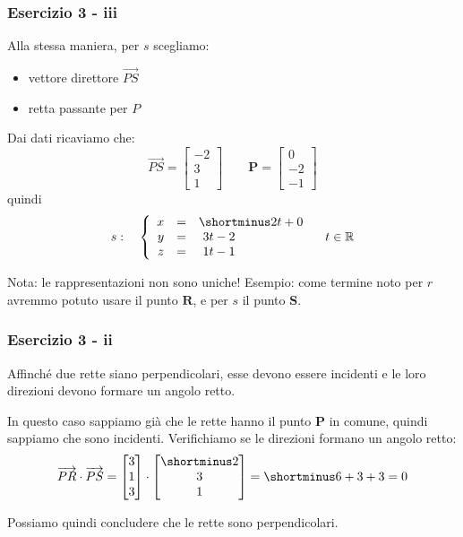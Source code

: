 \documentclass{beamer}
\begin{document}
\begin{frame}
\frametitle{Esercizio 3 - iii}

Alla stessa maniera, per $s$ scegliamo:
\begin{itemize}
        \item vettore direttore $\overrightarrow{PS}$
        \item retta passante per $P$
\end{itemize}
Dai dati ricaviamo che:
$$
\overrightarrow{PS} = \left[
\begin{array}{c}
-2\\
3\\
1
\end{array}
\right]
\qquad
\mathbf P = \left[
\begin{array}{c}
0\\
-2\\
-1
\end{array}
\right]
$$
quindi 
$$s: \quad \left\{
\begin{array}{rcl}
x&=&\shortminus 2t+0\\
y&=&\ 3t-2\\
z&=&\ 1t-1
\end{array}
\right. \quad t\in \mathbb{R}
$$

Nota: le rappresentazioni non sono uniche! Esempio: come termine noto
per $r$ avremmo potuto usare il punto $\mathbf R$, e per $s$ il punto $\mathbf S$.
\end{frame}

\begin{frame}
\frametitle{Esercizio 3 - ii}
Affinch\'e due rette siano perpendicolari, esse devono essere incidenti e le loro direzioni
devono formare un angolo retto.

    \vspace{0.4cm}
In questo caso sappiamo gi\`a che le rette hanno il punto $\mathbf P$ in comune, quindi sappiamo
che sono incidenti. Verifichiamo se le direzioni formano un angolo retto:
\begin{displaymath}
\overrightarrow{PR} \cdot \overrightarrow{PS}
    =
\begin{bmatrix} 3 \\ 1 \\3 \end{bmatrix}\cdot \begin{bmatrix}\shortminus 2\\ 3 \\1 \end{bmatrix} =
    \shortminus 6 + 3 + 3 = 0
\end{displaymath}

Possiamo quindi concludere che le rette sono perpendicolari.
\end{frame}
\end{document}

